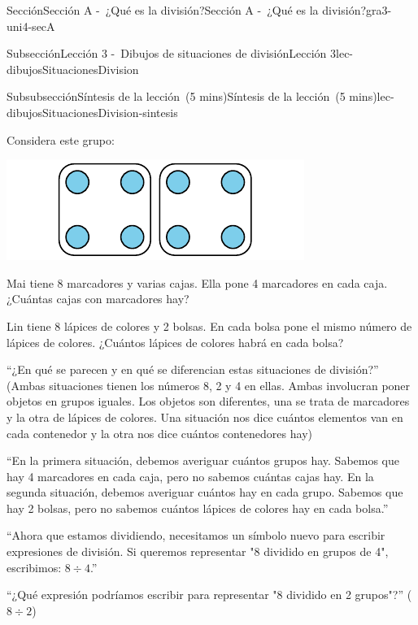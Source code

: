 \documentclass[oneside,10pt,]{article}
\begin{document}
\begin{sectionptx}{Sección}{Sección A -~¿Qué es la división?}{}{Sección A -~¿Qué es la división?}{}{}{gra3-uni4-secA}
\begin{subsectionptx}{Subsección}{Lección 3 -~Dibujos de situaciones de división}{}{Lección 3}{}{}{lec-dibujosSituacionesDivision}
\begin{subsubsectionptx}{Subsubsección}{Síntesis de la lección~(5 mins)}{}{Síntesis de la lección~(5 mins)}{}{}{lec-dibujosSituacionesDivision-sintesis}
\par
Considera este grupo:%
\begin{sidebyside}{3}{0.00833333333333333}{0.00833333333333333}{0.0166666666666667}%
\begin{sbspanel}{0.25}%
\includegraphics[width=\linewidth]{external/svg-source/tikz-file-149313.pdf}
\end{sbspanel}%
\begin{sbspanel}{0.35}%
Mai tiene 8 marcadores y varias cajas. Ella pone 4 marcadores en cada caja. ¿Cuántas cajas con marcadores hay?%
\end{sbspanel}%
\begin{sbspanel}{0.35}%
\par
Lin tiene 8 lápices de colores y 2 bolsas. En cada bolsa pone el mismo número de lápices de colores. ¿Cuántos lápices de colores habrá en cada bolsa?%
\end{sbspanel}%
\end{sidebyside}%
\par
``¿En qué se parecen y en qué se diferencian estas situaciones de división?'' (Ambas situaciones tienen los números 8, 2 y 4 en ellas. Ambas involucran poner objetos en grupos iguales. Los objetos son diferentes, una se trata de marcadores y la otra de lápices de colores. Una situación nos dice cuántos elementos van en cada contenedor y la otra nos dice cuántos contenedores hay)%
\par
``En la primera situación, debemos averiguar cuántos grupos hay. Sabemos que hay 4 marcadores en cada caja, pero no sabemos cuántas cajas hay. En la segunda situación, debemos averiguar cuántos hay en cada grupo. Sabemos que hay 2 bolsas, pero no sabemos cuántos lápices de colores hay en cada bolsa.''%
\par
``Ahora que estamos dividiendo, necesitamos un símbolo nuevo para escribir expresiones de división. Si queremos representar "8 dividido en grupos de 4", escribimos: \(8\div 4\).''%
\par
``¿Qué expresión podríamos escribir para representar "8 dividido en 2 grupos"?'' (\(8\div2\))%

\end{subsubsectionptx}
\end{subsectionptx}
\end{sectionptx}
\end{document}
